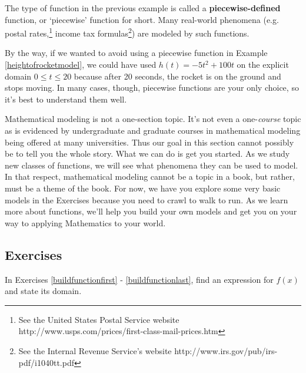 The type of function in the previous example is called a \textbf{piecewise-defined} function, or `piecewise' function for short.  Many real-world phenomena (e.g. postal rates,\footnote{See the United States Postal Service website http://www.usps.com/prices/first-class-mail-prices.htm} income tax formulas\footnote{See the Internal Revenue Service's website http://www.irs.gov/pub/irs-pdf/i1040tt.pdf}) are modeled by such functions.  

\label{piecewisefunction}

\medskip

By the way, if we wanted to avoid using a piecewise function in Example \ref{heightofrocketmodel}, we could have used $h(t) = -5t^2 + 100t$ on the explicit domain $0 \leq t \leq 20$ because after 20 seconds, the rocket is on the ground and stops moving.  In many cases, though, piecewise functions are your only choice, so it's best to understand them well.

\medskip

Mathematical modeling is not a one-section topic.  It's not even a one-\emph{course} topic as is evidenced by undergraduate and graduate courses in mathematical modeling being offered at many universities.  Thus our goal in this section cannot possibly be to tell you the whole story.  What we can do is get you started.  As we study new classes of functions, we will see what phenomena they can be used to model.  In that respect, mathematical modeling cannot be a topic in a book, but rather, must be a theme of the book.  For now, we have you explore some very basic models in the Exercises because you need to crawl to walk to run.  As we learn more about functions, we'll help you build your own models and get you on your way to applying Mathematics to your world.


\newpage

\subsection{Exercises}

In Exercises \ref{buildfunctionfirst} - \ref{buildfunctionlast}, find an expression for $f(x)$ and state its domain.

